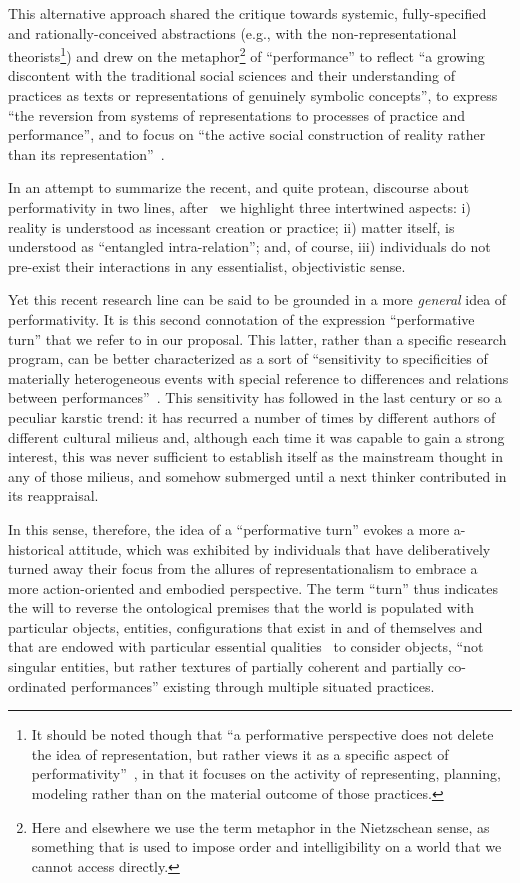 \documentclass{article}
\begin{document}
This alternative approach shared the critique towards systemic, fully-specified and rationally-conceived abstractions (e.g., with the non-representational theorists\footnote{It should be noted though that ``a performative perspective does not delete the idea of representation, but rather views it as a specific aspect of performativity''~\citep{jensen_experiment_2005}, in that it focuses on the activity of representing, planning, modeling rather than on the material outcome of those practices.}) and drew on the metaphor\footnote{Here and elsewhere we use the term metaphor in the Nietzschean sense, as something that is used to impose order and intelligibility on a world that we cannot access directly.} of ``performance'' to reflect ``a growing discontent with the traditional social sciences and their understanding of practices as texts or representations of genuinely symbolic concepts'', to express ``the reversion from systems of representations to processes of practice and performance'', and to focus on ``the active social construction of reality rather than its representation''~\citep{dirksmeier_time_2008}. 

In an attempt to summarize the recent, and quite protean, discourse about performativity in two lines, after~\citet{bramming_imperfect_2012} we highlight three intertwined aspects: i) reality is understood as incessant creation or practice; ii) matter itself, is understood as ``entangled intra-relation''; and, of course, iii) individuals do not pre-exist their interactions in any essentialist, objectivistic sense.




Yet this recent research line can be said to be grounded in a more \emph{general} idea of performativity. It is this second connotation of the expression ``performative turn'' that we refer to in our proposal. This latter, rather than a specific research program, can be better characterized as a sort of ``sensitivity to specificities of materially heterogeneous events with special reference to differences and relations between performances''~\citep{jensen_performing_2002}. This sensitivity has followed in the last century or so a peculiar karstic trend: it has recurred a number of times by different authors of different cultural milieus and, although each time it was capable to gain a strong interest, this was never sufficient to establish itself as the mainstream thought in any of those milieus, and somehow submerged until a next thinker contributed in its reappraisal. 

In this sense, therefore, the idea of a ``performative turn'' evokes a more a-historical attitude, which was exhibited by individuals that have deliberatively turned away their focus from the allures of representationalism to embrace a more action-oriented and embodied perspective. The term ``turn'' thus indicates the will to reverse the ontological premises that the world is populated with particular objects, entities, configurations that exist in and of themselves and that are endowed with particular essential qualities~\cite[p. 67]{jensen_performing_2002} to consider objects, ``not singular entities, but rather textures of partially coherent and partially co-ordinated performances'' existing through multiple situated practices. 
\end{document}
